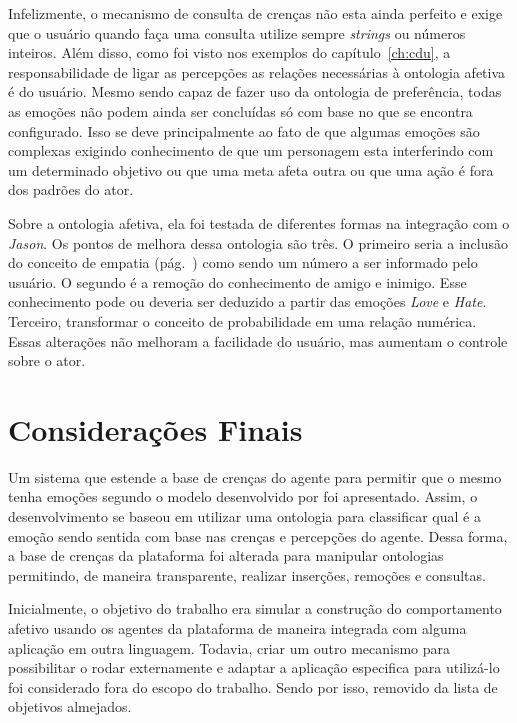 Infelizmente, o mecanismo de consulta de crenças não esta ainda perfeito e
exige que o usuário quando faça uma consulta utilize sempre \emph{strings} ou
números inteiros. Além disso, como foi visto nos exemplos do
capítulo~\ref{ch:cdu}, a responsabilidade de ligar as percepções as relações
necessárias à ontologia afetiva é do usuário. Mesmo sendo capaz de fazer uso
da ontologia de preferência, todas as emoções não podem ainda ser concluídas
só com base no que se encontra configurado. Isso se deve principalmente ao
fato de que algumas emoções são complexas exigindo conhecimento de que um
personagem esta interferindo com um determinado objetivo ou que uma meta afeta
outra ou que uma ação é fora dos padrões do ator.

Sobre a ontologia afetiva, ela foi testada de diferentes formas na integração
com o \emph{Jason}.
Os pontos de melhora dessa
ontologia são três. O primeiro seria a inclusão do conceito de empatia
(pág.~\pageref{mark:empat}) como sendo um número a ser informado pelo usuário.
O segundo é a remoção do conhecimento de amigo e inimigo. Esse conhecimento
pode ou deveria ser deduzido a partir das emoções \emph{Love} e \emph{Hate}.
Terceiro, transformar o conceito de probabilidade em uma relação numérica.
Essas alterações não melhoram a facilidade do usuário, mas aumentam o controle
sobre o ator.

\section{Considerações Finais}

Um sistema que estende a base de crenças do agente \jason para permitir que o
mesmo tenha emoções segundo o modelo desenvolvido por \citet{ortony1988cse}
foi apresentado. Assim, o desenvolvimento se baseou em utilizar uma ontologia
para classificar qual é a emoção sendo sentida com base nas crenças e
percepções do agente.
Dessa forma, a base de crenças da plataforma foi alterada para manipular
ontologias permitindo, de maneira transparente, realizar inserções, remoções e
consultas.

Inicialmente, o objetivo do trabalho era simular a construção do comportamento
afetivo usando os agentes da plataforma \jason de maneira integrada com alguma
aplicação em outra linguagem. Todavia, criar um outro mecanismo para possibilitar o
\jason rodar externamente e adaptar a aplicação especifica para utilizá-lo foi
considerado fora do escopo do trabalho. Sendo por isso, removido da lista de
objetivos almejados.

